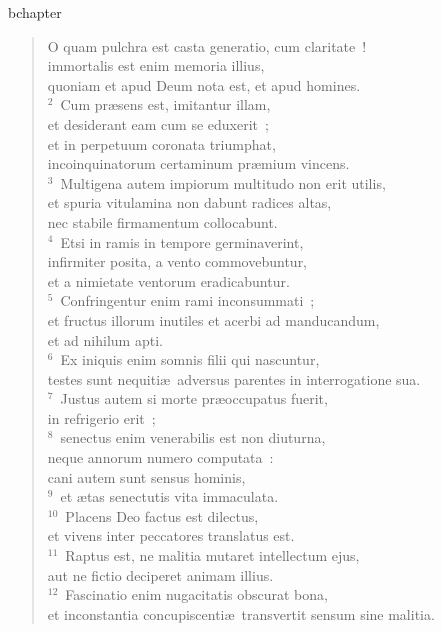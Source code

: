 bchapter\begin{flushleft}\begin{verse}\vspace{-19pt}O quam pulchra est casta generatio, cum claritate~!\\ immortalis est enim memoria illius,\\ quoniam et apud Deum nota est, et apud homines.\\
${}^{2}$~Cum pr\ae sens est, imitantur illam,\\ et desiderant eam cum se eduxerit~;\\ et in perpetuum coronata triumphat,\\ incoinquinatorum certaminum pr\ae mium vincens.\\
${}^{3}$~Multigena autem impiorum multitudo non erit utilis,\\ et spuria vitulamina non dabunt radices altas,\\ nec stabile firmamentum collocabunt.\\
${}^{4}$~Etsi in ramis in tempore germinaverint,\\ infirmiter posita, a vento commovebuntur,\\ et a nimietate ventorum eradicabuntur.\\
${}^{5}$~Confringentur enim rami inconsummati~;\\ et fructus illorum inutiles et acerbi ad manducandum,\\ et ad nihilum apti.\\
${}^{6}$~Ex iniquis enim somnis filii qui nascuntur,\\ testes sunt nequiti\ae\ adversus parentes in interrogatione sua.\\
${}^{7}$~Justus autem si morte pr\ae occupatus fuerit,\\ in refrigerio erit~;\\
${}^{8}$~senectus enim venerabilis est non diuturna,\\ neque annorum numero computata~:\\ cani autem sunt sensus hominis,\\
${}^{9}$~et \ae tas senectutis vita immaculata.\\
${}^{10}$~Placens Deo factus est dilectus,\\ et vivens inter peccatores translatus est.\\
${}^{11}$~Raptus est, ne malitia mutaret intellectum ejus,\\ aut ne fictio deciperet animam illius.\\
${}^{12}$~Fascinatio enim nugacitatis obscurat bona,\\ et inconstantia concupiscenti\ae\ transvertit sensum sine malitia.\\

\end{verse}
\end{flushleft}
